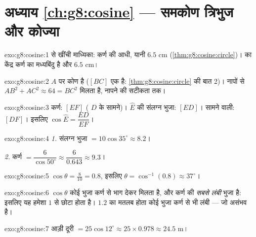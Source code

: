 \section*{अध्याय \ref{ch:g8:cosine} --- समकोण त्रिभुज और कोज्या}

\begin{solution}{exo:g8:cosine:1}
 से खींची माध्यिका: कर्ण की आधी, यानी $6.5$ cm
(\cref{thm:g8:cosine:circle})।  का केंद्र कर्ण का
मध्यबिंदु है और  $6.5$ cm।
\end{solution}

\begin{solution}{exo:g8:cosine:2}
$A$ पर कोण  है ($[BC]$ एक  है: \cref{thm:g8:cosine:circle}
की बात 2)। नापों से $AB^2 + AC^2 \approx 64 = BC^2$ मिलता है, नापने
की सटीकता तक।
\end{solution}

\begin{solution}{exo:g8:cosine:3}
कर्ण: $[EF]$ ( $D$ के सामने)। $\widehat E$ की संलग्न भुजा:
$[ED]$। सामने वाली: $[DF]$। इसलिए
$\cos\widehat E = \dfrac{ED}{EF}$।
\end{solution}

\begin{solution}{exo:g8:cosine:4}
\emph{1.} संलग्न भुजा $= 10 \cos 35^\circ \approx 8.2$।

\emph{2.} कर्ण $= \dfrac{6}{\cos 50^\circ} \approx
\dfrac{6}{0.643} \approx 9.3$।
\end{solution}

\begin{solution}{exo:g8:cosine:5}
$\cos\theta = \frac{8}{10} = 0.8$, इसलिए
$\theta = \cos^{-1}(0.8) \approx 37^\circ$।
\end{solution}

\begin{solution}{exo:g8:cosine:6}
$\cos\theta$ कोई  भुजा कर्ण से भाग देकर मिलता है, और कर्ण
 की \emph{सबसे लंबी} भुजा है: इसलिए यह  हमेशा $1$
से छोटा होता है। $1.2$ का मतलब होता कोई  भुजा कर्ण से भी लंबी
--- जो असंभव है।
\end{solution}

\begin{solution}{exo:g8:cosine:7}
आड़ी दूरी $= 25 \cos 12^\circ \approx 25 \times 0.978 \approx
24.5$ m।
\end{solution}

